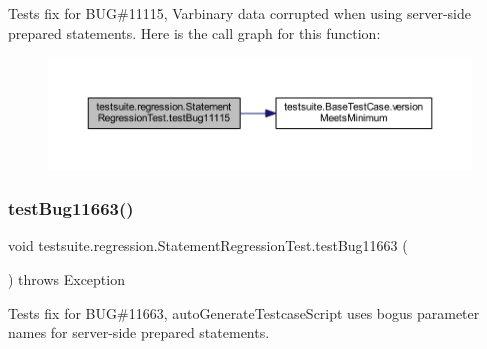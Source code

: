 Tests fix for B\+UG\#11115, Varbinary data corrupted when using server-\/side prepared statements. Here is the call graph for this function\+:
\nopagebreak
\begin{figure}[H]
\begin{center}
\leavevmode
\includegraphics[width=350pt]{classtestsuite_1_1regression_1_1_statement_regression_test_a5eed5fd0591511a13f3159bd29366e80_cgraph}
\end{center}
\end{figure}
\mbox{\label{classtestsuite_1_1regression_1_1_statement_regression_test_aad9a4a5d28e804097e535c055838a4e6}} 
\subsubsection{\texorpdfstring{test\+Bug11663()}{testBug11663()}}
{\footnotesize\ttfamily void testsuite.\+regression.\+Statement\+Regression\+Test.\+test\+Bug11663 (\begin{DoxyParamCaption}{ }\end{DoxyParamCaption}) throws Exception}

Tests fix for B\+UG\#11663, auto\+Generate\+Testcase\+Script uses bogus parameter names for server-\/side prepared statements.


